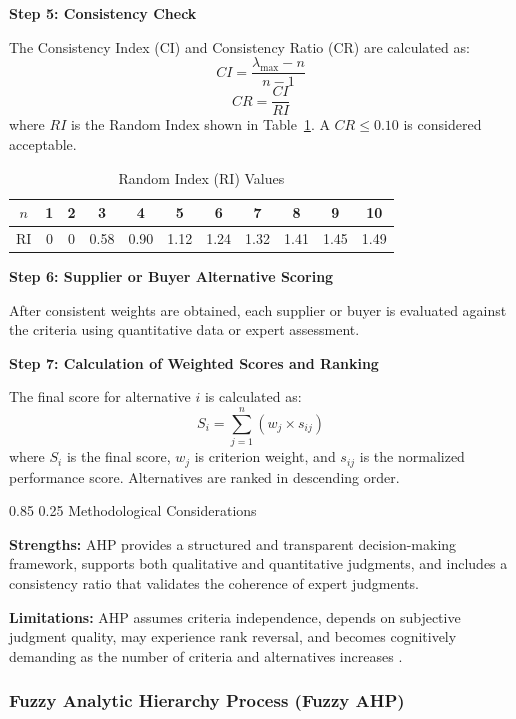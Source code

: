 \documentclass[11pt]{article}
\makeatletter
\renewcommand\paragraph{\@startsection{paragraph}{4}{\z@}%
  {0.85\baselineskip}%
  {0.25\baselineskip}%
  {\normalfont\normalsize\bfseries}}
\newcommand{\stepheading}[1]{%
\par\vspace{0.75\baselineskip}%
\noindent\textbf{#1}\par
\vspace{0.25\baselineskip}%
}
\makeatother
\begin{document}
\stepheading{Step 5: Consistency Check}

The Consistency Index (CI) and Consistency Ratio (CR) are calculated as:
\[
CI=\frac{\lambda_{\max}-n}{n-1}
\]
\[
CR=\frac{CI}{RI}
\]
where $RI$ is the Random Index shown in Table~\ref{tab:ri_values}. A $CR\leq0.10$ is considered acceptable.

\begin{table}[H]
\centering
\caption{Random Index (RI) Values}
\label{tab:ri_values}
\begin{tabular}{ccccccccccc}
\toprule
$n$ & 1 & 2 & 3 & 4 & 5 & 6 & 7 & 8 & 9 & 10 \\
\midrule
RI & 0 & 0 & 0.58 & 0.90 & 1.12 & 1.24 & 1.32 & 1.41 & 1.45 & 1.49 \\
\bottomrule
\end{tabular}
\end{table}

\stepheading{Step 6: Supplier or Buyer Alternative Scoring}

After consistent weights are obtained, each supplier or buyer is evaluated against the criteria using quantitative data or expert assessment.

\stepheading{Step 7: Calculation of Weighted Scores and Ranking}

The final score for alternative $i$ is calculated as:
\[
S_i=\sum_{j=1}^{n}(w_j\times s_{ij})
\]
where $S_i$ is the final score, $w_j$ is criterion weight, and $s_{ij}$ is the normalized performance score. Alternatives are ranked in descending order.

\paragraph{Methodological Considerations}

\textbf{Strengths:} AHP provides a structured and transparent decision-making framework, supports both qualitative and quantitative judgments, and includes a consistency ratio that validates the coherence of expert judgments.

\textbf{Limitations:} AHP assumes criteria independence, depends on subjective judgment quality, may experience rank reversal, and becomes cognitively demanding as the number of criteria and alternatives increases \cite{ref34,ref50}.

\subsubsection{Fuzzy Analytic Hierarchy Process (Fuzzy AHP)}
\end{document}
